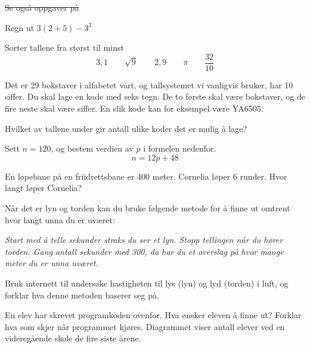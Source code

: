 





\st{Se også oppgaver på }	\newpage	

Regn ut $ 3(2+5)-3^2  $

Sorter tallene fra størst til minst
\[ 3,1\qquad\sqrt{9}\qquad2,9\qquad\pi \qquad \frac{32}{10} \]

Det er 29 bokstaver i alfabetet vårt, og tallsystemet vi vanligvis bruker, har 10 siffer.
Du skal lage en kode med seks tegn. De to første skal være bokstaver, og de fire neste skal være
siffer. En slik kode kan for eksempel være YA6505. \os

Hvilket av tallene under gir antall ulike koder det er mulig å lage? \os
{}

Sett $ n=120 $, og bestem verdien av $ p $ i formelen nedenfor. 
\[ n = 12p + 48 \]

En løpebane på en friidrettsbane er 400 meter.
Cornelia løper 6 runder. Hvor langt løper Cornelia? \os


Når det er lyn og torden kan du bruke følgende metode for å finne ut omtrent hvor langt unna du er uværet:\os

\textsl{Start med å telle sekunder straks du ser et lyn. Stopp tellingen når du hører torden. Gang antall sekunder med 300, da har du et overslag på hvor mange meter du er unna uværet.}\os

Bruk internett til undersøke hastigheten til lys (lyn) og lyd (torden) i luft, og forklar hva denne metoden baserer seg på.

En elev har skrevet programkoden ovenfor.
Hva ønsker eleven å finne ut?
Forklar hva som skjer når programmet kjøres.
\newpage
{}
Diagrammet viser antall elever ved en videregående skole de fire siste årene.\os


